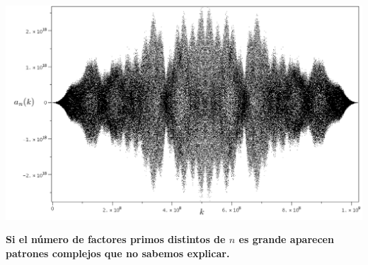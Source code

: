 \documentclass[10pt,compress]{beamer}
\begin{document}
\begin{frame}
  \vspace*{-1mm}
  \begin{example}[$n = 3234846615 = 3 \cdot 5 \cdot 7 \cdot 11 \cdot 13 \cdot 17 \cdot 19 \cdot 23
    \cdot 29$]
    \vspace*{-3mm}
    \begin{center}
      \includegraphics[width=\textwidth]{./images/cyclo-coeffs.png}
    \end{center}
    \vspace*{-4mm}
  \end{example}
  \vspace*{-1mm}
  \begin{tcolorbox}[colback=ChetwodeBlue!10,colframe=ChetwodeBlue!60]
    \begin{center}
      \vspace*{-2mm} {\color{TurkishRose}\textbf{Si el número de factores primos distintos de $n$ es
          grande aparecen patrones complejos que no sabemos explicar.}}
    \end{center}
    \vspace*{-5mm}
  \end{tcolorbox}
\end{frame}
\end{document}
